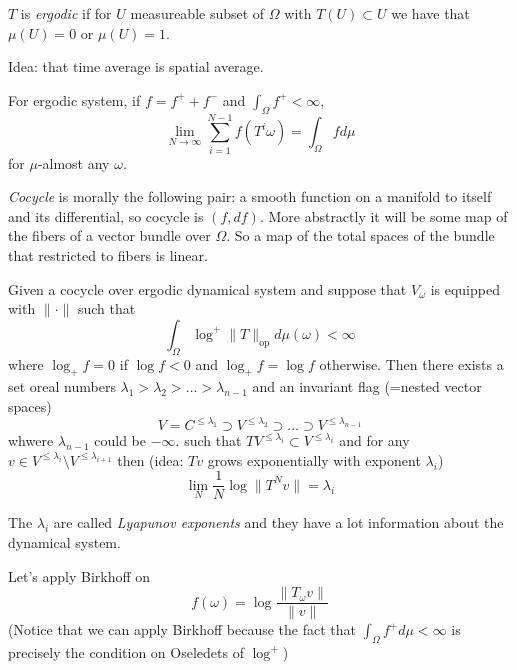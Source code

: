 \begin{definition}
\label{definition-ko-ergodic}
$T$ is \textit{ergodic} if for $U$
measureable subset of  $\Omega$ with
$T(U) \subset U$ we have that $\mu(U) =0$ or
$\mu(U)=1$.
\end{definition}

\begin{theorem}
\label{theorem-ko-birkhoff}
Idea: that time average is spatial average.

For ergodic system, if $f=f^+ + f^-$ and
$\int_\Omega f^+ < \infty$,
$$
\lim_{N \to \infty}
\sum_{i=1}^{N-1}f(T^i \omega)
=\int_\Omega fd\mu
$$
for  $\mu$-almost any $\omega$.
\end{theorem}

\begin{definition}
\label{definition-ko-cocycle}
\textit{Cocycle} is morally the following
pair: a smooth function on a manifold to
itself and its differential, so cocycle is
$(f,df)$. More abstractly it will be some map
of the fibers of a vector bundle over
$\Omega$. So a map of the total spaces of the
bundle that restricted to fibers is linear.
\end{definition}

\medskip{}

\begin{theorem}
\label{theorem-ko-oseledets}
Given a cocycle over ergodic dynamical system
and suppose that $V_\omega$ is equipped with
$\|\cdot \|$ such that
$$
\int_\Omega \operatorname{log}^+
\|T\|_{\operatorname{op}}d\mu(\omega)
< \infty
$$
where $\operatorname{log}_+ f=0$ if
$\operatorname{log}f<0$ and
$\operatorname{log}_+ f=\operatorname{log}f$
otherwise. Then there exists a set oreal
numbers
$\lambda_1>\lambda_2>\ldots>\lambda_{n-1}$
and an invariant flag (=nested vector spaces)
$$
V=C^{\leq  \lambda_1}\supset
V^{\leq  \lambda_2}\supset \ldots\supset
V^{\leq  \lambda_{n-1}}
$$
whwere $\lambda_{n-1}$ could be $-\infty$.
such that $TV^{\leq \lambda_i}\subset
V^{\leq  \lambda_i}$ and for any
$v \in V^{\leq  \lambda_i}\setminus
V^{\leq \lambda_{i+1}}$ then
(idea: $Tv$ grows exponentially with exponent
$\lambda_i$)
$$
\lim_{N} \frac{1}{N}\operatorname{log}
\| T^Nv\|=\lambda_i
$$
\end{theorem}

The $\lambda_i$ are called
\textit{Lyapunov exponents} and they have a
lot information about the dynamical system.

\medskip{}
Let's apply Birkhoff on
$$
f(\omega)=\operatorname{log}
\frac{\|T_\omega v\|}{\| v\|}
$$
(Notice that we can apply Birkhoff because
the fact that $\int_\Omega f^+ d\mu< \infty$
is precisely the  condition on Oseledets of
$\operatorname{log}^+$)


